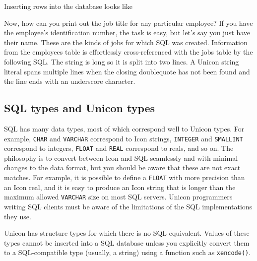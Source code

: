 
\noindent
Inserting rows into the database looks like


Now, how can you print out the job title for any particular employee? If
you have the employee's identification number, the
task is easy, but let's say you just have their name.
These are the kinds of jobs for which SQL was created. Information from
the employees table is effortlessly cross-referenced with the jobs
table by the following SQL. The string is long so it is split into
two lines. A Unicon string literal spans multiple lines when the
closing doublequote has not been found and the line ends with an
underscore character.


\subsection{SQL types and Unicon types}

SQL has many data types, most of which correspond well to Unicon types.
For example, \texttt{CHAR} and \texttt{VARCHAR} correspond to Icon
strings, \texttt{INTEGER} and \texttt{SMALLINT} correspond to integers,
\texttt{FLOAT} and \texttt{REAL} correspond to reals, and so on. The
philosophy is to convert between Icon and SQL seamlessly and with
minimal changes to the data format, but you should be aware that these
are not exact matches. For example, it is possible to define a
\texttt{FLOAT} with more precision than an Icon real, and it is easy to
produce an Icon string that is longer than the maximum allowed
\texttt{VARCHAR} size on most SQL servers. Unicon programmers writing
SQL clients must be aware of the limitations of the SQL implementations
they use.

Unicon has structure types for which there is no SQL equivalent. Values
of these types cannot be inserted into a SQL database unless you
explicitly convert them to a SQL-compatible type (usually, a string)
using a function such as \texttt{xencode()}.

